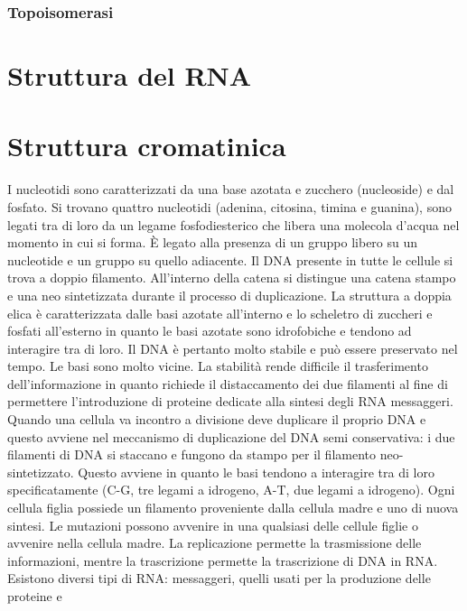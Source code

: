 \subsubsection{Topoisomerasi}



\section{Struttura del RNA}



\section{Struttura cromatinica}




I nucleotidi sono caratterizzati da una base azotata e 
zucchero (nucleoside) e dal fosfato. Si trovano quattro nucleotidi (adenina, citosina, timina e guanina), sono legati tra di loro da un legame fosfodiesterico che libera una molecola
d'acqua nel momento in cui si forma. \`E legato alla presenza di un gruppo  libero su un nucleotide e un gruppo  su quello adiacente. Il DNA presente in tutte le cellule si
trova a doppio filamento. All'interno della catena si distingue una catena stampo e una neo sintetizzata durante il processo di duplicazione. La struttura a doppia elica \`e 
caratterizzata dalle basi azotate all'interno e lo scheletro di zuccheri e fosfati all'esterno in quanto le basi azotate sono idrofobiche e tendono ad interagire tra di loro. Il DNA 
\`e pertanto molto stabile e pu\`o essere preservato nel tempo. Le basi sono molto vicine. La stabilit\`a rende difficile il trasferimento dell'informazione in quanto richiede 
il distaccamento dei due filamenti al fine di permettere l'introduzione di proteine dedicate alla sintesi degli RNA messaggeri. Quando una cellula va incontro a divisione deve duplicare
il proprio DNA e questo avviene nel meccanismo di duplicazione del DNA semi conservativa: i due filamenti di DNA si staccano e fungono da stampo per il filamento neo-sintetizzato. Questo
avviene in quanto le basi tendono a interagire tra di loro specificatamente (C-G, tre legami a idrogeno, A-T, due legami a idrogeno). Ogni cellula figlia possiede un filamento 
proveniente dalla cellula madre e uno di nuova sintesi. Le mutazioni possono avvenire in una qualsiasi delle cellule figlie o avvenire nella cellula madre. La replicazione permette la
trasmissione delle informazioni, mentre la trascrizione permette la trascrizione di DNA in RNA. Esistono diversi tipi di RNA: messaggeri, quelli usati per la produzione delle proteine e

